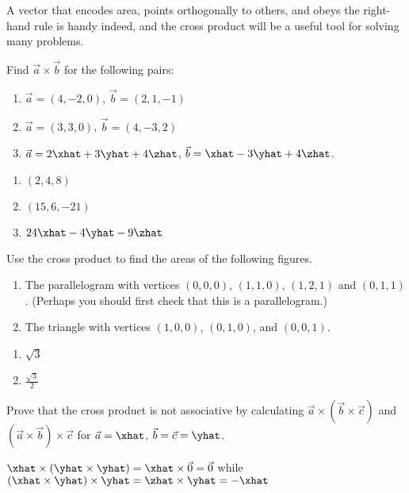 A vector that encodes area, points orthogonally to others, and obeys the right-hand
rule is handy indeed, and the cross product will be a useful tool for solving
many problems.


\begin{exercises}
    \begin{problist}
        \prob   Find $\vec{a} \times \vec{b}$ for the following pairs:
        \begin{enumerate}
            \item   $\vec{a} = (4, -2, 0)$, $\vec{b} = (2, 1, -1)$
            \item   $\vec{a} = (3, 3, 0)$, $\vec{b} = (4, -3, 2)$
            \item   $\vec{a} = 2\xhat + 3\yhat + 4\zhat$, $\vec{b} = \xhat - 3\yhat + 4\zhat$.
        \end{enumerate}
        \begin{solution}
            \begin{enumerate}
                \item   $(2,4,8)$
                \item   $(15,6,-21)$
                \item   $24\xhat -4\yhat -9\zhat$
            \end{enumerate}
        \end{solution}

        \prob   Use the cross product to find the areas of the following figures.
        \begin{enumerate}
            \item   The parallelogram with vertices $(0,0,0)$, $(1, 1, 0)$, $(1,2,1)$ and $(0,1,1)$.
                (Perhaps you should first check that this is a parallelogram.)
            \item   The triangle with vertices $(1,0,0)$, $(0,1,0)$, and $(0,0,1)$.
        \end{enumerate}
        \begin{solution}
            \begin{enumerate}
                \item   $\sqrt3$
                \item   $\frac{\sqrt3}{2}$
            \end{enumerate}
        \end{solution}

        \prob   Prove that the cross product is not associative by calculating $\vec{a} \times (\vec{b}
        \times \vec{c})$ and $(\vec{a} \times \vec{b}) \times \vec{c}$ for $\vec{a} = \xhat$, $\vec{b} =
        \vec{c} = \yhat$.
        \begin{solution}
            $\xhat \times (\yhat \times \yhat)=\xhat \times \vec{0} = \vec{0}$ while $(\xhat \times
            \yhat) \times \yhat = \zhat \times \yhat = -\xhat$
        \end{solution}
        

\end{problist}
\end{exercises}
